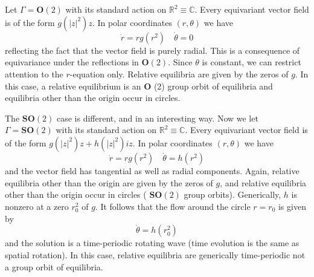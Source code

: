 \documentclass{scrartcl}
\begin{document}
    \begin{example}\label{golubitsky2000symmetry:ex:6.1}
      Let \(\Gamma=\mathbf{O}(2)\) with its standard action on \(\mathbb{R}^{2} \equiv \mathbb{C}\).
      Every equivariant vector field is of the form \(g\left(|z|^{2}\right) z\).
      In polar coordinates \((r, \theta)\) we have
      \begin{equation*}
        \dot{r}=r g\left(r^{2}\right) \quad \dot{\theta}=0
      \end{equation*}
      reflecting the fact that the vector field is purely radial.
      This is a consequence of equivariance under the reflections in \(\mathbf{O}(2)\).
      Since \(\theta\) is constant, we can restrict attention to the \(r\)-equation only.
      Relative equilibria are given by the zeros of \(g\).
      In this case, a relative equilibrium is an \(\mathbf{O}\) (2) group orbit of equilibria and equilibria other than the origin occur in circles.
    \end{example}
    \begin{example}\label{golubitsky2000symmetry:ex:6.2}
      The \(\mathbf{S O}(2)\) case is different, and in an interesting way.
      Now we let \(\Gamma=\mathbf{S O}(2)\) with its standard action on \(\mathbb{R}^{2} \equiv \mathbb{C}\).
      Every equivariant vector field is of the form \(g\left(|z|^{2}\right) z + h\left(|z|^{2}\right) i z\).
      In polar coordinates \((r, \theta)\) we have
      \begin{equation*}
        \dot{r}=r g\left(r^{2}\right) \quad \dot{\theta}=h\left(r^{2}\right)
      \end{equation*}
      and the vector field has tangential as well as radial components.
      Again, relative equilibria other than the origin are given by the zeros of \(g\), and relative equilibria other than the origin occur in circles ( \(\mathbf{S O}(2)\) group orbits).
      Generically, \(h\) is nonzero at a zero \(r_{0}^{2}\) of \(g\).
      It follows that the flow around the circle \(r = r_{0}\) is given by
      \begin{equation*}
        \dot{\theta}=h\left(r_{0}^{2}\right)
      \end{equation*}
      and the solution is a time-periodic rotating wave (time evolution is the same as spatial rotation).
      In this case, relative equilibria are generically time-periodic not a group orbit of equilibria.
    \end{example}
\end{document}
